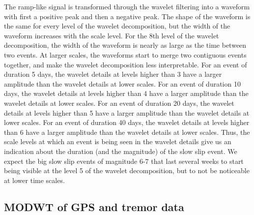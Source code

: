 \documentclass{article}
\begin{document}
The ramp-like signal is transformed through the wavelet filtering into a waveform with first a positive peak and then a negative peak. The shape of the waveform is the same for every level of the wavelet decomposition, but the width of the waveform increases with the scale level. For the 8th level of the wavelet decomposition, the width of the waveform is nearly as large as the time between two events. At larger scales, the waveforms start to merge two contiguous events together, and make the wavelet decomposition less interpretable. For an event of duration 5 days, the wavelet details at levels higher than 3 have a larger amplitude than the wavelet details at lower scales. For an event of duration 10 days, the wavelet details at levels higher than 4 have a larger amplitude than the wavelet details at lower scales. For an event of duration 20 days, the wavelet details at levels higher than 5 have a larger amplitude than the wavelet details at lower scales. For an event of duration 40 days, the wavelet details at levels higher than 6 have a larger amplitude than the wavelet details at lower scales. Thus, the scale levels at which an event is being seen in the wavelet details give us an indication about the duration (and the magnitude) of the slow slip event. We expect the big slow slip events of magnitude 6-7 that last several weeks to start being visible at the level 5 of the wavelet decomposition, but to not be noticeable at lower time scales. \\

\subsection{MODWT of GPS and tremor data}
\end{document}

